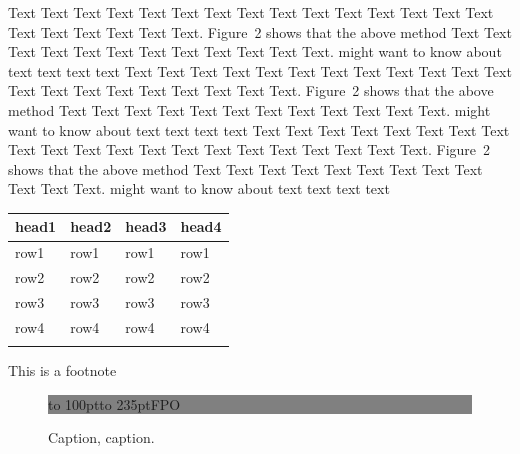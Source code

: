 \documentclass{bioinfo}
\begin{document}
\begin{methods}
Text Text Text Text Text Text  Text Text Text Text Text Text Text
Text Text  Text Text Text Text Text Text.
Figure~2\vphantom{\ref{fig:02}} shows that the above method  Text
Text Text Text  Text Text Text Text Text Text  Text Text.
\citealp{Boffelli03} might want to know about  text text text text
Text Text Text Text Text Text  Text Text Text Text Text Text Text
Text Text  Text Text Text Text Text Text.
Figure~2\vphantom{\ref{fig:02}} shows that the above method  Text
Text Text Text  Text Text Text Text Text Text  Text Text.
\citealp{Boffelli03} might want to know about  text text text text
Text Text Text Text Text Text Text Text Text Text Text Text Text
Text Text  Text Text Text Text Text Text.
Figure~2\vphantom{\ref{fig:02}} shows that the above method  Text
Text Text Text  Text Text Text Text Text Text  Text Text.
\citealp{Boffelli03} might want to know about  text text text text

\begin{table}[!t]
 {\begin{tabular}{@{}llll@{}}\toprule head1 &
head2 & head3 & head4\\\midrule
row1 & row1 & row1 & row1\\
row2 & row2 & row2 & row2\\
row3 & row3 & row3 & row3\\
row4 & row4 & row4 & row4\\\botrule
\end{tabular}}{This is a footnote}
\end{table}

\end{methods}

\begin{figure}[!tpb]%
\fboxsep=0pt\colorbox{gray}{\begin{minipage}[t]{235pt} \vbox to 100pt{\vfill\hbox to
235pt{\hfill\fontsize{24pt}{24pt}\selectfont FPO\hfill}\vfill}
\end{minipage}}
\caption{Caption, caption.}\label{fig:01}
\end{figure}

\end{document}
